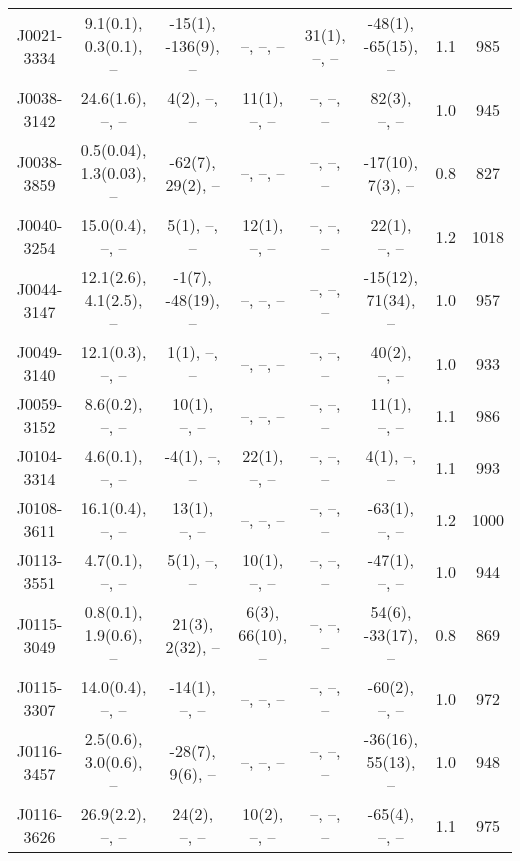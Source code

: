 \documentclass{mnras}
\begin{document}
\begin{table*}
\begin{tabular}{cccccccc}
J0021-3334 & 9.1(0.1), 0.3(0.1), -- & -15(1), -136(9), -- & --, --, -- & 31(1), --, -- & -48(1), -65(15), -- & 1.1 & 985 \\ 

J0038-3142 & 24.6(1.6), --, -- & 4(2), --, -- & 11(1), --, -- & --, --, -- & 82(3), --, -- & 1.0 & 945 \\ 

J0038-3859 & 0.5(0.04), 1.3(0.03), -- & -62(7), 29(2), -- & --, --, -- & --, --, -- & -17(10), 7(3), -- & 0.8 & 827 \\ 

J0040-3254 & 15.0(0.4), --, -- & 5(1), --, -- & 12(1), --, -- & --, --, -- & 22(1), --, -- & 1.2 & 1018 \\ 

J0044-3147 & 12.1(2.6), 4.1(2.5), -- & -1(7), -48(19), -- & --, --, -- & --, --, -- & -15(12), 71(34), -- & 1.0 & 957 \\ 

J0049-3140 & 12.1(0.3), --, -- & 1(1), --, -- & --, --, -- & --, --, -- & 40(2), --, -- & 1.0 & 933 \\ 

J0059-3152 & 8.6(0.2), --, -- & 10(1), --, -- & --, --, -- & --, --, -- & 11(1), --, -- & 1.1 & 986 \\ 

J0104-3314 & 4.6(0.1), --, -- & -4(1), --, -- & 22(1), --, -- & --, --, -- & 4(1), --, -- & 1.1 & 993 \\ 

J0108-3611 & 16.1(0.4), --, -- & 13(1), --, -- & --, --, -- & --, --, -- & -63(1), --, -- & 1.2 & 1000 \\ 

J0113-3551 & 4.7(0.1), --, -- & 5(1), --, -- & 10(1), --, -- & --, --, -- & -47(1), --, -- & 1.0 & 944 \\ 

J0115-3049 & 0.8(0.1), 1.9(0.6), -- & 21(3), 2(32), -- & 6(3), 66(10), -- & --, --, -- & 54(6), -33(17), -- & 0.8 & 869 \\ 

J0115-3307 & 14.0(0.4), --, -- & -14(1), --, -- & --, --, -- & --, --, -- & -60(2), --, -- & 1.0 & 972 \\ 

J0116-3457 & 2.5(0.6), 3.0(0.6), -- & -28(7), 9(6), -- & --, --, -- & --, --, -- & -36(16), 55(13), -- & 1.0 & 948 \\ 

J0116-3626 & 26.9(2.2), --, -- & 24(2), --, -- & 10(2), --, -- & --, --, -- & -65(4), --, -- & 1.1 & 975 \\ 


\end{tabular}
\end{table*}
\end{document}
